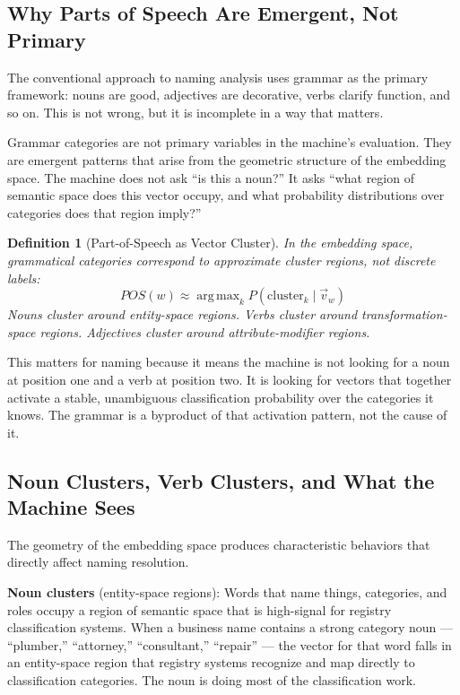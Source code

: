 \documentclass[12pt, openany]{book}
\theoremstyle{thmstyle}
\theoremstyle{defstyle}
\newtheorem{definition}{Definition}[chapter]
\DeclareMathOperator*{\argmax}{arg\,max}
\begin{document}
\subsection{Why Parts of Speech Are Emergent, Not Primary}

The conventional approach to naming analysis uses grammar as the primary framework: nouns are good, adjectives are decorative, verbs clarify function, and so on. This is not wrong, but it is incomplete in a way that matters.

Grammar categories are not primary variables in the machine's evaluation. They are emergent patterns that arise from the geometric structure of the embedding space. The machine does not ask ``is this a noun?'' It asks ``what region of semantic space does this vector occupy, and what probability distributions over categories does that region imply?''

\begin{definition}[Part-of-Speech as Vector Cluster]
In the embedding space, grammatical categories correspond to approximate cluster regions, not discrete labels:
\[
POS(w) \approx \argmax_k P(\text{cluster}_k \mid \vec{v}_w)
\]
Nouns cluster around entity-space regions. Verbs cluster around transformation-space regions. Adjectives cluster around attribute-modifier regions.
\end{definition}

This matters for naming because it means the machine is not looking for a noun at position one and a verb at position two. It is looking for vectors that together activate a stable, unambiguous classification probability over the categories it knows. The grammar is a byproduct of that activation pattern, not the cause of it.

\subsection{Noun Clusters, Verb Clusters, and What the Machine Sees}

The geometry of the embedding space produces characteristic behaviors that directly affect naming resolution.

\textbf{Noun clusters} (entity-space regions): Words that name things, categories, and roles occupy a region of semantic space that is high-signal for registry classification systems. When a business name contains a strong category noun --- ``plumber,'' ``attorney,'' ``consultant,'' ``repair'' --- the vector for that word falls in an entity-space region that registry systems recognize and map directly to classification categories. The noun is doing most of the classification work.
\end{document}
